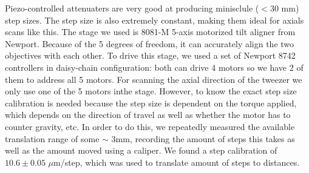 Piezo-controlled attenuaters are very good at producing minisclule ($<30$ mm) step sizes. The step size is also extremely constant, making them ideal for axials scans like this.
The stage we used is 8081-M 5-axis motorized tilt aligner from Newport. 
Because of the 5 degrees of freedom, it can accurately align the two objectives with each other. 
To drive this stage, we used a set of Newport 8742 controllers in daisy-chain configuration: both can drive 4 motors so we have 2 of them to address all 5 motors.
For scanning the axial direction of the tweezer we only use one of the 5 motors inthe stage. 
However, to know the exact step size calibration is needed because the step size is dependent on the torque applied, which depends on the direction of travel as well as whether the motor has to counter gravity, etc.
In order to do this, we repeatedly measured the available translation range of some $\sim$ 3mm, recording the amount of steps this takes as well as the amount moved using a caliper. 
We found a step calibration of $10.6 \pm 0.05$ $\mu$m/step, which was used to translate amount of steps to distances. 











